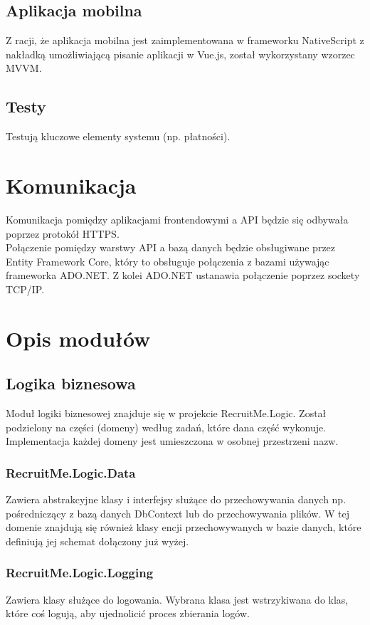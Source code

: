 \documentclass{article}
\begin{document}
\subsection{Aplikacja mobilna}
Z racji, że aplikacja mobilna jest zaimplementowana w frameworku NativeScript z nakładką umożliwiającą pisanie aplikacji w Vue.js, został wykorzystany wzorzec MVVM.
\subsection{Testy}
Testują kluczowe elementy systemu (np. płatności).

\section{Komunikacja}
Komunikacja pomiędzy aplikacjami frontendowymi a API będzie się odbywała poprzez protokół HTTPS.
\\
Połączenie pomiędzy warstwy API a bazą danych będzie obsługiwane przez Entity Framework Core, który to obsługuje połączenia z bazami używając frameworka ADO.NET. Z kolei ADO.NET ustanawia połączenie poprzez sockety TCP/IP. 

\section{Opis modułów}
\subsection{Logika biznesowa}
Moduł logiki biznesowej znajduje się w projekcie RecruitMe.Logic. Został podzielony na części (domeny) według zadań, które dana część wykonuje. Implementacja każdej domeny jest umieszczona w osobnej przestrzeni nazw.

\subsubsection{RecruitMe.Logic.Data}
Zawiera abstrakcyjne klasy i interfejsy służące do przechowywania danych np. pośredniczący z bazą danych DbContext lub do przechowywania plików. W tej domenie znajdują się również klasy encji przechowywanych w bazie danych, które definiują jej schemat dołączony już wyżej.

\subsubsection{RecruitMe.Logic.Logging}
Zawiera klasy służące do logowania. Wybrana klasa jest wstrzykiwana do klas, które coś logują, aby ujednolicić proces zbierania logów.
\end{document}

